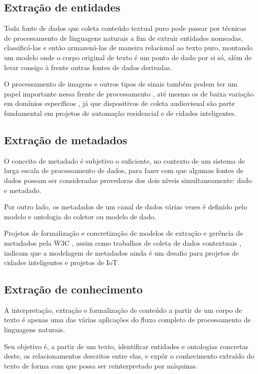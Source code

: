 \subsection{Extração de entidades} \label{ss:extracao_de_entidades}

Toda fonte de dados que coleta conteúdo textual puro pode passar por técnicas de processamento de linguagens naturais a fim de extrair entidades nomeadas, classificá-las e então armazená-las de maneira relacional ao texto puro, montando um modelo onde o corpo original de texto é um ponto de dado por si só, além de levar consigo à frente outras fontes de dados derivadas. 

O processamento de imagens e outros tipos de sinais também podem ter um papel importante nessa frente de processamento \cite{cornel:ner}, até mesmo os de baixa variação em domínios específicos \cite{aalto:ner}, já que dispositivos de coleta audiovisual são parte fundamental em projetos de automação residencial e de cidades inteligentes.

\subsection{Extração de metadados} \label{ss:extracao_de_metadados}

O conceito de metadado é subjetivo o suficiente, no contexto de um sistema de larga escala de processamento de dados, para fazer com que algumas fontes de dados possam ser consideradas provedoras dos dois níveis simultaneamente: dado e metadado.

Por outro lado, os metadados de um canal de dados várias vezes é definido pelo modelo e ontologia do coletor ou modelo de dado. 

Projetos de formalização e concretização de modelos de extração e gerência de metadados pela W3C \cite{w3c:ssn}, assim como trabalhos de coleta de dados contextuais \cite{contextualdata:smartcities}, indicam que a modelagem de metadados ainda é um desafio para projetos de cidades inteligentes e projetos de IoT.

\subsection{Extração de conhecimento} \label{ss:extracao_de_conhecimento}

A interpretação, extração e formalização de conteúdo a partir de um corpo de texto é apenas uma das várias aplicações do fluxo completo de processamento de linguagens naturais.

Seu objetivo é, a partir de um texto, identificar entidades e ontologias concretas deste, os relacionamentos descritos entre elas, e expôr o conhecimento extraído do texto de forma com que possa ser reinterpretado por máquinas.